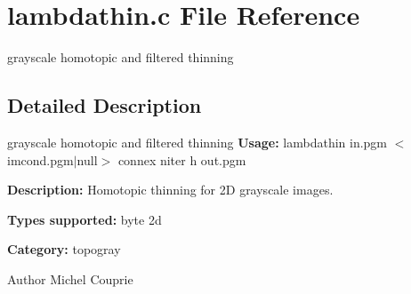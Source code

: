\section{lambdathin.c File Reference}
\label{lambdathin_8c}


grayscale homotopic and filtered thinning  




\subsection{Detailed Description}
grayscale homotopic and filtered thinning {\bfseries Usage:} lambdathin in.pgm $<$imcond.pgm$|$null$>$ connex niter h out.pgm

{\bfseries Description:} Homotopic thinning for 2D grayscale images.

{\bfseries Types supported:} byte 2d

{\bfseries Category:} topogray

\begin{DoxyAuthor}{Author}
Michel Couprie 
\end{DoxyAuthor}
